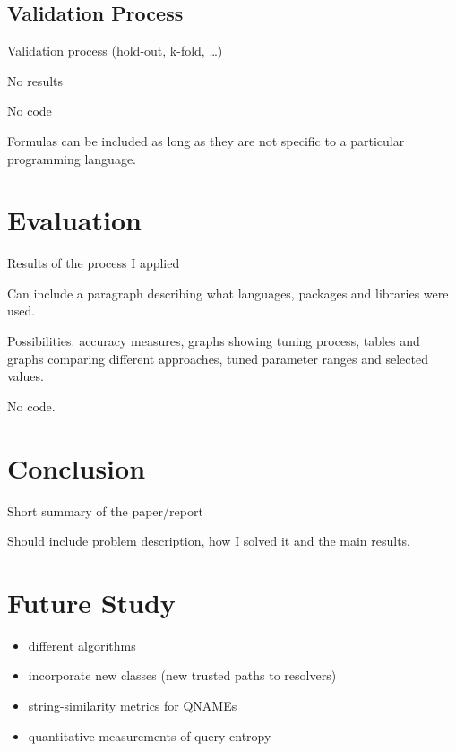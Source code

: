\documentclass[conference]{IEEEtran}
\let\tightlist\relax %
\begin{document}
\subsection{Validation Process}\label{sec:validation-process}

Validation process (hold-out, k-fold, \ldots{})

No results

No code

Formulas can be included as long as they are not specific to a
particular programming language.

\section{Evaluation}\label{sec:evaluation}

\label{sec:evaluation}

Results of the process I applied

Can include a paragraph describing what languages, packages and
libraries were used.

Possibilities: accuracy measures, graphs showing tuning process, tables
and graphs comparing different approaches, tuned parameter ranges and
selected values.

No code.

\section{Conclusion}\label{sec:conclusion}

\label{sec:conclusion}

Short summary of the paper/report

Should include problem description, how I solved it and the main
results.

\section{Future Study}\label{sec:future-study}

\label{sec:future}

\begin{itemize}
\tightlist
\item
  different algorithms
\item
  incorporate new classes (new trusted paths to resolvers)
\item
  string-similarity metrics for QNAMEs
\item
  quantitative measurements of query entropy
\end{itemize}
\end{document}
